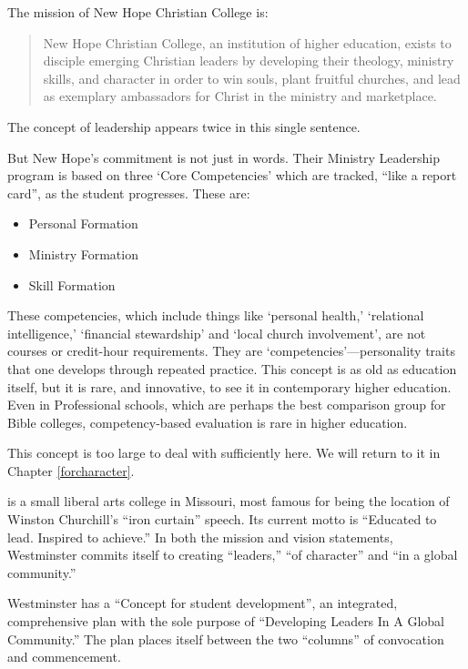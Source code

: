 The mission of New Hope Christian College is: 

\begin{quote}

New Hope Christian College, an institution of higher education, exists to disciple emerging Christian leaders by developing their theology, ministry skills, and character in order to win souls, plant fruitful churches, and lead as exemplary ambassadors for Christ in the ministry and marketplace.
\end{quote}

The concept of leadership appears twice in this single sentence. 

But New Hope's commitment is not just in words. Their Ministry Leadership program is based on three `Core Competencies' which are tracked, ``like a report card'', as the student progresses. These are:

\begin{itemize}
\item Personal Formation

\item Ministry Formation

\item Skill Formation

\end{itemize}

These competencies, which include things like `personal health,' `relational intelligence,' `financial stewardship' and `local church involvement', are not courses or credit-hour requirements. They are `competencies'---personality traits that one develops through repeated practice. This concept is as old as education itself, but it is rare, and innovative, to see it in contemporary higher education. Even in Professional schools, which are perhaps the best comparison group for Bible colleges, competency-based evaluation is rare in higher education.

This concept is too large to deal with sufficiently here. We will return to it in Chapter \ref{forcharacter}. 

 is a small liberal arts college in Missouri, most famous for being the location of Winston Churchill's ``iron curtain'' speech. Its current motto is ``Educated to lead. Inspired to achieve.'' In both the mission and vision statements, Westminster commits itself to creating ``leaders,'' ``of character'' and ``in a global community.''

Westminster has a ``Concept for student development'', an integrated, comprehensive plan with the sole purpose of ``Developing Leaders In A Global Community.'' The plan places itself between the two ``columns'' of convocation and commencement.

